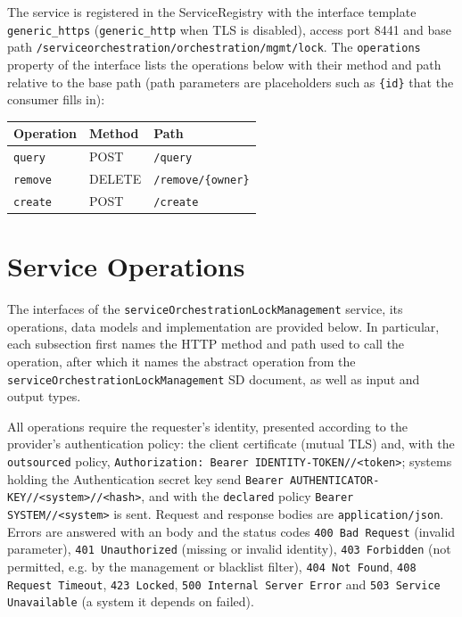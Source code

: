 \documentclass[a4paper]{arrowhead}
\newcommand{\mref}[2][]{{\textcolor{ArrowheadPurple}{\hyperref[sec:model:#2]{\ifstrempty{#1}{#2}{#1}}}}}
\begin{document}
The service is registered in the ServiceRegistry with the interface template \texttt{generic\_\allowbreak{}https} (\texttt{generic\_\allowbreak{}http} when TLS is disabled), access port 8441 and base path \texttt{/\allowbreak{}serviceorchestration/\allowbreak{}orchestration/\allowbreak{}mgmt/\allowbreak{}lock}. The \texttt{operations} property of the interface lists the operations below with their method and path relative to the base path (path parameters are placeholders such as \texttt{\{id\}} that the consumer fills in):

\noindent\begin{longtable}{| p{5.2cm} | p{1.6cm} | p{8.4cm} |} \hline
\rowcolor{gray!33} Operation & Method & Path \\ \hline \endhead
\texttt{query} & POST & \texttt{/\allowbreak{}query} \\ \hline
\texttt{remove} & DELETE & \texttt{/\allowbreak{}remove/\allowbreak{}\{owner\}} \\ \hline
\texttt{create} & POST & \texttt{/\allowbreak{}create} \\ \hline
\end{longtable}

\newpage

\section{Service Operations}
\label{sec:operations}

The interfaces of the \texttt{service\allowbreak{}Orchestration\allowbreak{}Lock\allowbreak{}Management} service, its operations, data models and implementation are provided below.
In particular, each subsection first names the HTTP method and path used to call the operation, after which it names the abstract operation from the \texttt{service\allowbreak{}Orchestration\allowbreak{}Lock\allowbreak{}Management} SD document, as well as input and output types.

All operations require the requester's identity, presented according to the provider's authentication policy: the client certificate (mutual TLS) and, with the \texttt{outsourced} policy, \texttt{Authorization: Bearer IDENTITY-TOKEN//<token>}; systems holding the Authentication secret key send \texttt{Bearer AUTHENTICATOR-KEY//<system>//<hash>}, and with the \texttt{declared} policy \texttt{Bearer SYSTEM//<system>} is sent. Request and response bodies are \texttt{application/json}.
Errors are answered with an \mref{ErrorMessage} body and the status codes \texttt{400 Bad Request} (invalid parameter), \texttt{401 Unauthorized} (missing or invalid identity), \texttt{403 Forbidden} (not permitted, e.g. by the management or blacklist filter), \texttt{404 Not Found}, \texttt{408 Request Timeout}, \texttt{423 Locked}, \texttt{500 Internal Server Error} and \texttt{503 Service Unavailable} (a system it depends on failed).
\end{document}
